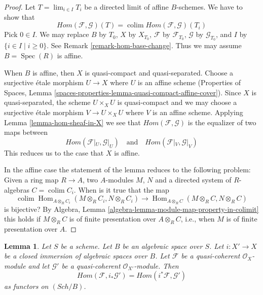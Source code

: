 \documentclass{stacks-project}
\theoremstyle{plain}
\newtheorem{lemma}[subsection]{Lemma}
\theoremstyle{definition}
\theoremstyle{remark}
\numberwithin{equation}{subsection}
\def\lim{\mathop{\mathrm{lim}}\nolimits}
\def\colim{\mathop{\mathrm{colim}}\nolimits}
\def\Spec{\mathop{\mathrm{Spec}}}
\def\Hom{\mathop{\mathrm{Hom}}\nolimits}
\def\Sch{\mathit{Sch}}
\begin{document}
\begin{proof}
Let $T = \lim_{i \in I} T_i$ be a directed limit of affine $B$-schemes.
We have to show that
$$
\mathit{Hom}(\mathcal{F}, \mathcal{G})(T) =
\colim \mathit{Hom}(\mathcal{F}, \mathcal{G})(T_i)
$$
Pick $0 \in I$. We may replace $B$ by $T_0$, $X$ by $X_{T_0}$,
$\mathcal{F}$ by $\mathcal{F}_{T_0}$, $\mathcal{G}$ by
$\mathcal{G}_{T_0}$, and $I$ by $\{i \in I \mid i \geq 0\}$.
See Remark \ref{remark-hom-base-change}.
Thus we may assume $B = \Spec(R)$ is affine.

\medskip\noindent
When $B$ is affine, then $X$ is quasi-compact and quasi-separated.
Choose a surjective \'etale morphism $U \to X$ where $U$ is an
affine scheme (Properties of Spaces, Lemma
\ref{spaces-properties-lemma-quasi-compact-affine-cover}).
Since $X$ is quasi-separated, the scheme $U \times_X U$ is quasi-compact
and we may choose a surjective \'etale morphism $V \to U \times_X U$
where $V$ is an affine scheme. Applying Lemma \ref{lemma-hom-sheaf-in-X}
we see that $\mathit{Hom}(\mathcal{F}, \mathcal{G})$ is the
equalizer of two maps between
$$
\mathit{Hom}(\mathcal{F}|_U, \mathcal{G}|_U)
\quad\text{and}\quad
\mathit{Hom}(\mathcal{F}|_V, \mathcal{G}|_V)
$$
This reduces us to the case that $X$ is affine.

\medskip\noindent
In the affine case the statement of the lemma reduces to
the following problem: Given a ring map $R \to A$, two $A$-modules
$M$, $N$ and a directed system of $R$-algebras $C = \colim C_i$.
When is it true that the map
$$
\colim \Hom_{A \otimes_R C_i}(M \otimes_R C_i, N \otimes_R C_i)
\longrightarrow
\Hom_{A \otimes_R C}(M \otimes_R C, N \otimes_R C)
$$
is bijective? By
Algebra, Lemma \ref{algebra-lemma-module-map-property-in-colimit}
this holds if $M \otimes_R C$ is of finite presentation over
$A \otimes_R C$, i.e., when $M$ is of finite presentation over $A$.
\end{proof}

\begin{lemma}
\label{lemma-hom-closed}
Let $S$ be a scheme. Let $B$ be an algebraic space over $S$.
Let $i : X' \to X$ be a closed immersion of algebraic spaces
over $B$. Let $\mathcal{F}$ be a quasi-coherent $\mathcal{O}_X$-module
and let $\mathcal{G}'$ be a quasi-coherent $\mathcal{O}_{X'}$-module.
Then
$$
\mathit{Hom}(\mathcal{F}, i_*\mathcal{G}') =
\mathit{Hom}(i^*\mathcal{F}, \mathcal{G}')
$$
as functors on $(\Sch/B)$.
\end{lemma}
\end{document}
